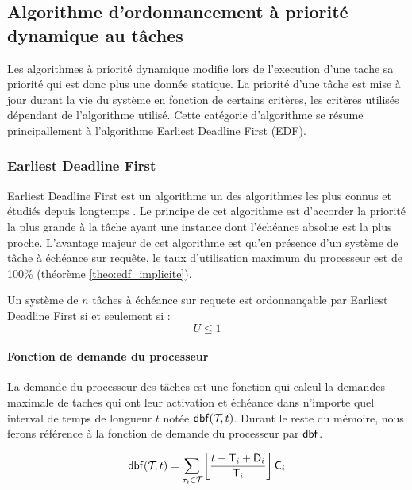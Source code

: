 \subsection{Algorithme d’ordonnancement à priorité dynamique au t\^aches}
Les algorithmes à priorité dynamique modifie lors de l'execution d'une
tache sa priorité qui est donc plus une donnée statique. La priorité
d'une tâche est mise à jour durant la vie du système en fonction de
certains critères, les critères utilisés dépendant de l'algorithme
utilisé. Cette catégorie d'algorithme se résume principallement à
l'algorithme Earliest Deadline First (EDF).

\subsubsection{Earliest Deadline First\cite{LL73}}
Earliest Deadline First est un algorithme un des algorithmes les plus
connus et étudiés depuis longtemps \cite{LL73, Der74, Hor74}. Le
principe de cet algorithme est d'accorder la priorité la plus grande à
la tâche ayant une instance dont l'échéance absolue est la plus
proche.  L'avantage majeur de cet algorithme est qu'en présence d'un
système de tâche à échéance sur requête, le taux d'utilisation maximum
du processeur est de 100\% (théorème \ref{theo:edf_implicite}).

\begin{theoreme}[\cite{LL73}]\label{theo:edf_implicite}
 Un système de $n$ tâches à échéance sur requete  est ordonnançable par
 Earliest Deadline First si et seulement si :
 \begin{equation}
 U \leq 1
 \end{equation}
\end{theoreme}

\paragraph{Fonction de demande du processeur}
La demande du processeur des tâches est une fonction qui calcul la
demandes maximale de taches qui ont leur activation et échéance dans
n'importe quel interval de temps de longueur $t$ notée
$\mathsf{dbf}(\mathcal{T}_{},t)$. Durant le reste du mémoire, nous ferons
référence à la fonction de demande du processeur par $\mathsf{dbf}$.

\begin{equation}
\mathsf{dbf}(\mathcal{T}_{},t) = \sum_{\tau_{i}\in\mathcal{T}_{}} \left\lfloor \frac{t-\mathsf{T}_{i}+\mathsf{D}_{i}}{\mathsf{T}_{i}}\right\rfloor \mathsf{C}_{i}
\end{equation}


